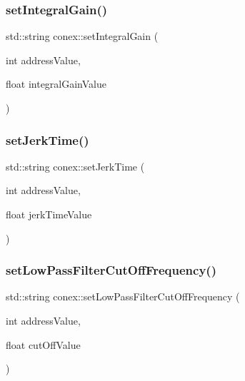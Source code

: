 \mbox{\label{namespaceconex_af806b975f4f1ce8ee3e83ce660f72593}} 
\subsubsection{\texorpdfstring{set\+Integral\+Gain()}{setIntegralGain()}}
{\footnotesize\ttfamily std\+::string conex\+::set\+Integral\+Gain (\begin{DoxyParamCaption}\item[{int}]{address\+Value,  }\item[{float}]{integral\+Gain\+Value }\end{DoxyParamCaption})}

\mbox{\label{namespaceconex_aa3f88891fb93e706d4be157b584a7f42}} 
\subsubsection{\texorpdfstring{set\+Jerk\+Time()}{setJerkTime()}}
{\footnotesize\ttfamily std\+::string conex\+::set\+Jerk\+Time (\begin{DoxyParamCaption}\item[{int}]{address\+Value,  }\item[{float}]{jerk\+Time\+Value }\end{DoxyParamCaption})}

\mbox{\label{namespaceconex_a32f3870ece6ee316eff312c20fe069d3}} 
\subsubsection{\texorpdfstring{set\+Low\+Pass\+Filter\+Cut\+Off\+Frequency()}{setLowPassFilterCutOffFrequency()}}
{\footnotesize\ttfamily std\+::string conex\+::set\+Low\+Pass\+Filter\+Cut\+Off\+Frequency (\begin{DoxyParamCaption}\item[{int}]{address\+Value,  }\item[{float}]{cut\+Off\+Value }\end{DoxyParamCaption})}

